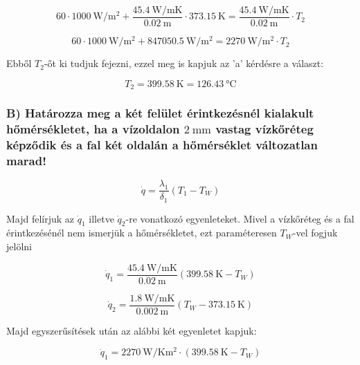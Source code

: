 \begin{equation}
60 \cdot \SI{1000}{\watt\per\meter\squared}+  \frac{\SI{45.4}{\watt\per\meter\kelvin}}{\SI{0.02}{\meter}} \cdot \SI{373.15}{\kelvin}=  \frac{\SI{45.4}{\watt\per\meter\kelvin}}{\SI{0.02}{\meter}} \cdot T_2
\end{equation}

\begin{equation}
60 \cdot \SI{1000}{\watt\per\meter\squared} + \SI{847050.5}{\watt\per\meter\squared} = \SI{2270}{\watt\per\meter\squared} \cdot T_2
\end{equation}
\vspace{1mm}

Ebből $T_2$-őt ki tudjuk fejezni, ezzel meg is kapjuk az 'a' kérdésre a választ:

\begin{equation}
T_2 = \SI{399.58}{\kelvin} = \SI{126.43}{\celsius}
\end{equation}

\vspace{1mm}

\subsubsection*{B)  Határozza meg a két felület érintkezésnél kialakult hőmérsékletet, ha a vízoldalon $\SI{2}{\milli\meter}$ vastag vízkőréteg képződik és a fal két oldalán a hőmérséklet változatlan marad!}

\begin{equation}
	 \dot{q} = \frac{\lambda_1}{\delta_1} (T_1 - T_W)
\end{equation}

Majd felírjuk az $\dot{q}_1$ illetve $\dot{q}_2$-re vonatkozó egyenleteket. Mivel a vízkőréteg és a fal érintkezésénél nem ismerjük a hőmérsékletet, ezt paraméteresen $T_W$-vel fogjuk jelölni

\begin{equation}
	 \dot{q}_1 =  \frac{\SI{45.4}{\watt\per\meter\kelvin}}{\SI{0.02}{\meter}} (\SI{399.58}{\kelvin} - T_W)
\end{equation}


\begin{equation}
	 \dot{q}_2 =  \frac{\SI{1.8}{\watt\per\meter\kelvin}}{\SI{0.002}{\meter}} (T_W - \SI{373.15}{\kelvin})
\end{equation}

Majd egyszerűsítések után az alábbi két egyenletet kapjuk:

\begin{equation}     
     \dot{q}_1 = \SI{2270}{\watt\per\kelvin\meter\squared} \cdot (\SI{399.58}{\kelvin} - T_W)
\end{equation}


